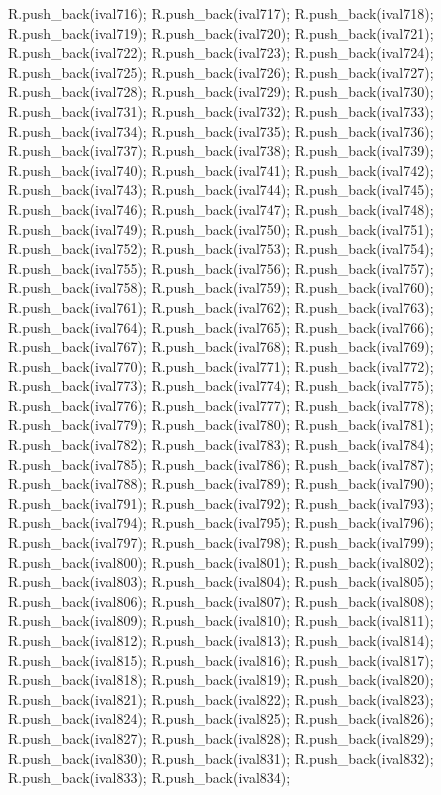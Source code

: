 \begin{DoxyCode}
{R.push_back(ival716);
R.push_back(ival717);
R.push_back(ival718);
R.push_back(ival719);
R.push_back(ival720);
R.push_back(ival721);
R.push_back(ival722);
R.push_back(ival723);
R.push_back(ival724);
R.push_back(ival725);
R.push_back(ival726);
R.push_back(ival727);
R.push_back(ival728);
R.push_back(ival729);
R.push_back(ival730);
R.push_back(ival731);
R.push_back(ival732);
R.push_back(ival733);
R.push_back(ival734);
R.push_back(ival735);
R.push_back(ival736);
R.push_back(ival737);
R.push_back(ival738);
R.push_back(ival739);
R.push_back(ival740);
R.push_back(ival741);
R.push_back(ival742);
R.push_back(ival743);
R.push_back(ival744);
R.push_back(ival745);
R.push_back(ival746);
R.push_back(ival747);
R.push_back(ival748);
R.push_back(ival749);
R.push_back(ival750);
R.push_back(ival751);
R.push_back(ival752);
R.push_back(ival753);
R.push_back(ival754);
R.push_back(ival755);
R.push_back(ival756);
R.push_back(ival757);
R.push_back(ival758);
R.push_back(ival759);
R.push_back(ival760);
R.push_back(ival761);
R.push_back(ival762);
R.push_back(ival763);
R.push_back(ival764);
R.push_back(ival765);
R.push_back(ival766);
R.push_back(ival767);
R.push_back(ival768);
R.push_back(ival769);
R.push_back(ival770);
R.push_back(ival771);
R.push_back(ival772);
R.push_back(ival773);
R.push_back(ival774);
R.push_back(ival775);
R.push_back(ival776);
R.push_back(ival777);
R.push_back(ival778);
R.push_back(ival779);
R.push_back(ival780);
R.push_back(ival781);
R.push_back(ival782);
R.push_back(ival783);
R.push_back(ival784);
R.push_back(ival785);
R.push_back(ival786);
R.push_back(ival787);
R.push_back(ival788);
R.push_back(ival789);
R.push_back(ival790);
R.push_back(ival791);
R.push_back(ival792);
R.push_back(ival793);
R.push_back(ival794);
R.push_back(ival795);
R.push_back(ival796);
R.push_back(ival797);
R.push_back(ival798);
R.push_back(ival799);
R.push_back(ival800);
R.push_back(ival801);
R.push_back(ival802);
R.push_back(ival803);
R.push_back(ival804);
R.push_back(ival805);
R.push_back(ival806);
R.push_back(ival807);
R.push_back(ival808);
R.push_back(ival809);
R.push_back(ival810);
R.push_back(ival811);
R.push_back(ival812);
R.push_back(ival813);
R.push_back(ival814);
R.push_back(ival815);
R.push_back(ival816);
R.push_back(ival817);
R.push_back(ival818);
R.push_back(ival819);
R.push_back(ival820);
R.push_back(ival821);
R.push_back(ival822);
R.push_back(ival823);
R.push_back(ival824);
R.push_back(ival825);
R.push_back(ival826);
R.push_back(ival827);
R.push_back(ival828);
R.push_back(ival829);
R.push_back(ival830);
R.push_back(ival831);
R.push_back(ival832);
R.push_back(ival833);
R.push_back(ival834);
}
\end{DoxyCode}
